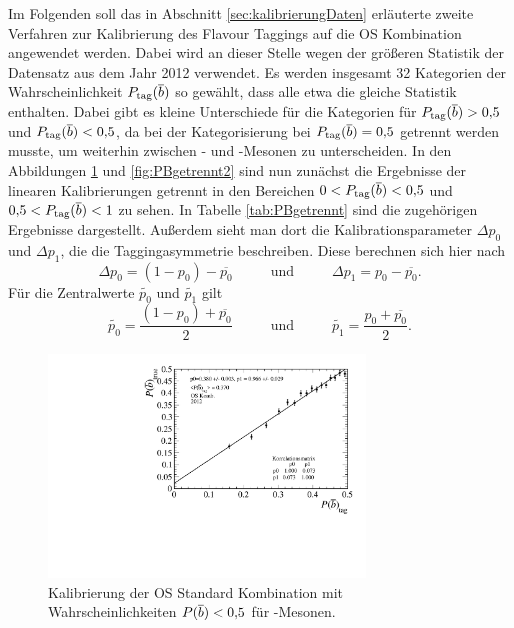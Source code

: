 Im Folgenden soll das in Abschnitt \ref{sec:kalibrierungDaten} erläuterte zweite Verfahren zur Kalibrierung des Flavour Taggings auf die OS Kombination angewendet werden. Dabei wird an dieser Stelle wegen der größeren Statistik der Datensatz aus dem Jahr \num{2012} verwendet. Es werden insgesamt \num{32} Kategorien der Wahrscheinlichkeit $P_\text{tag}({\overline {{b}}})$ so gewählt, dass alle etwa die gleiche Statistik enthalten. Dabei gibt es kleine Unterschiede für die Kategorien für $P_\text{tag}({\overline {{b}}})>0{,}5$ und $P_\text{tag}({\overline {{b}}})<0{,}5$, da bei der Kategorisierung bei $P_\text{tag}({\overline {{b}}})=0{,}5$ getrennt werden musste, um weiterhin zwischen \Bz- und \Bzb-Mesonen zu unterscheiden. In den Abbildungen \ref{fig:PBgetrennt1} und \ref{fig:PBgetrennt2} sind nun zunächst die Ergebnisse der linearen Kalibrierungen getrennt in den Bereichen $0<P_\text{tag}({\overline {{b}}})<0{,}5$ und $0{,}5<P_\text{tag}({\overline {{b}}})<1$ zu sehen. In Tabelle \ref{tab:PBgetrennt} sind die zugehörigen Ergebnisse dargestellt. Außerdem sieht man dort die Kalibrationsparameter $\Delta p_0$ und $\Delta p_1$, die die Taggingasymmetrie beschreiben. Diese berechnen sich hier nach
\begin{equation}
\Delta p_0=\left(1-p_0\right)-\overline{p_0}\hspace{1cm}\text{ und }\hspace{1cm}\Delta p_1=p_0-\overline{p_0}.
\end{equation}
Für die Zentralwerte $\widetilde{p_0}$ und $\widetilde{p_1}$ gilt
\begin{equation}
\widetilde{p_0}=\frac{\left(1-p_0\right)+\overline{p_0}}{2}\hspace{1cm}\text{ und }\hspace{1cm}\widetilde{p_1}=\frac{p_0+\overline{p_0}}{2}.
\end{equation}
 \begin{figure}[htbp]
	\centering
		\includegraphics[width=0.75\textwidth]{fig/calibration_Bbar.pdf}
	\caption{Kalibrierung der OS Standard Kombination mit Wahrscheinlichkeiten $P({\overline {{b}}})<0{,}5$ für \Bzb-Mesonen.}
	\label{fig:PBgetrennt1} 
\end{figure} 
